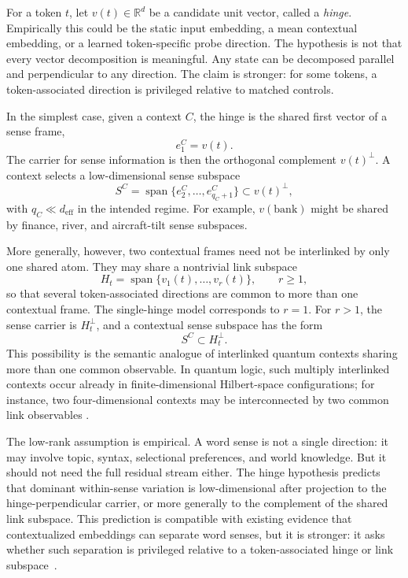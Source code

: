\documentclass[
  aps,
  reprint,
  superscriptaddress,
  floatfix,
  nofootinbib,
  longbibliography
]{revtex4-2}
\newcommand{\R}{\mathbb{R}}
\newcommand{\deff}{d_{\mathrm{eff}}}
\DeclareMathOperator{\spanop}{span}
\begin{document}
For a token $t$, let $v(t)\in\R^d$ be a candidate unit vector, called
a \emph{hinge}. Empirically this could be the static input embedding,
a mean contextual embedding, or a learned token-specific probe
direction. The hypothesis is not that every vector decomposition is
meaningful. Any state can be decomposed parallel and perpendicular to
any direction. The claim is stronger: for some tokens, a
token-associated direction is privileged relative to matched controls.

In the simplest case, given a context $C$, the hinge is the shared
first vector of a sense frame,
%
\begin{equation}
\label{eq:hinge-first}
e_1^C=v(t).
\end{equation}
%
The carrier for sense information is then the orthogonal complement
$v(t)^\perp$. A context selects a low-dimensional sense subspace
%
\begin{equation}
\label{eq:sense-subspace}
S^C=\spanop\{e_2^C,\dots,e_{q_C+1}^C\}
\subset v(t)^\perp ,
\end{equation}
%
with $q_C\ll\deff$ in the intended regime. For example,
$v(\text{bank})$ might be shared by finance, river, and aircraft-tilt
sense subspaces.

More generally, however, two contextual frames need not be interlinked
by only one shared atom. They may share a nontrivial link subspace
%
\begin{equation}
\label{eq:multi-hinge}
H_t=\spanop\{v_1(t),\dots,v_r(t)\},
\qquad r\ge 1 ,
\end{equation}
%
so that several token-associated directions are common to more than
one contextual frame. The single-hinge model corresponds to $r=1$.
For $r>1$, the sense carrier is $H_t^\perp$, and a contextual sense
subspace has the form
%
\begin{equation}
\label{eq:multi-sense-subspace}
S^C\subset H_t^\perp .
\end{equation}
%
This possibility is the semantic analogue of interlinked quantum
contexts sharing more than one common observable. In quantum logic,
such multiply interlinked contexts occur already in finite-dimensional
Hilbert-space configurations; for instance, two four-dimensional
contexts may be interconnected by two common link observables
\cite{svozil:040102}.

The low-rank assumption is empirical. A word sense is not a single
direction: it may involve topic, syntax, selectional preferences, and
world knowledge. But it should not need the full residual stream
either. The hinge hypothesis predicts that dominant within-sense
variation is low-dimensional after projection to the hinge-perpendicular
carrier, or more generally to the complement of the shared link
subspace. This prediction is compatible with existing evidence that
contextualized embeddings can separate word senses, but it is stronger:
it asks whether such separation is privileged relative to a
token-associated hinge or link subspace~\cite{wiedemann2019does,scarlini2020ares}.
\end{document}
